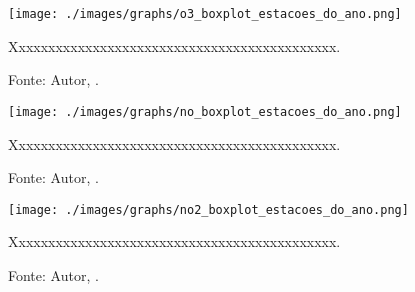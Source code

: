 



\begin{figure}[H]
    \centering
    \texttt{[image: ./images/graphs/o3\_boxplot\_estacoes\_do\_ano.png]}
    \caption{Xxxxxxxxxxxxxxxxxxxxxxxxxxxxxxxxxxxxxxxxxxxx.}
    \label{fig:o3_boxplot_estacoes_do_ano.png}
    \caption*{Fonte: Autor, \imprimirdata.}
\end{figure}




\begin{figure}[H]
    \centering
    \texttt{[image: ./images/graphs/no\_boxplot\_estacoes\_do\_ano.png]}
    \caption{Xxxxxxxxxxxxxxxxxxxxxxxxxxxxxxxxxxxxxxxxxxxx.}
    \label{fig:no_boxplot_estacoes_do_ano.png}
    \caption*{Fonte: Autor, \imprimirdata.}
\end{figure}




\begin{figure}[H]
    \centering
    \texttt{[image: ./images/graphs/no2\_boxplot\_estacoes\_do\_ano.png]}
    \caption{Xxxxxxxxxxxxxxxxxxxxxxxxxxxxxxxxxxxxxxxxxxxx.}
    \label{fig:no2_boxplot_estacoes_do_ano.png}
    \caption*{Fonte: Autor, \imprimirdata.}
\end{figure}





